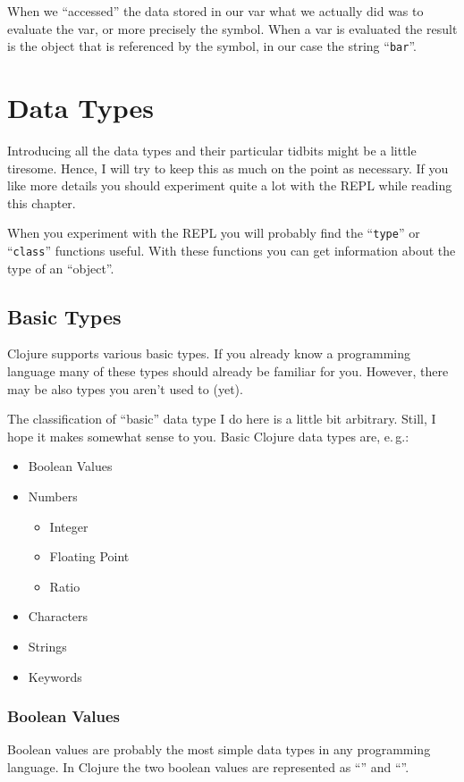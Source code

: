 When we ``accessed'' the data stored in our var what we actually did was to evaluate the var, or more precisely the symbol.
When a var is evaluated the result is the object that is referenced by the symbol, in our case the string ``\texttt{bar}''.

\section{Data Types}
Introducing all the data types and their particular tidbits might be a little tiresome.
Hence, I will try to keep this as much on the point as necessary.
If you like more details you should experiment quite a lot with the REPL while reading this chapter.

When you experiment with the REPL you will probably find the ``\texttt{type}'' or ``\texttt{class}'' functions useful.
With these functions you can get information about the type of an ``object''.

\subsection{Basic Types}
Clojure supports various basic types.
If you already know a programming language many of these types should already be familiar for you.
However, there may be also types you aren't used to (yet).

The classification of ``basic'' data type I do here is a little bit arbitrary.
Still, I hope it makes somewhat sense to you.
Basic Clojure data types are, e.\,g.:

\begin{itemize}
  \item Boolean Values
  \item Numbers
    \begin{itemize}
      \item Integer
      \item Floating Point
      \item Ratio
    \end{itemize}
  \item Characters
  \item Strings
  \item Keywords
\end{itemize}

\subsubsection{Boolean Values}
Boolean values are probably the most simple data types in any programming language.
In Clojure the two boolean values are represented as ``'' and ``''.

